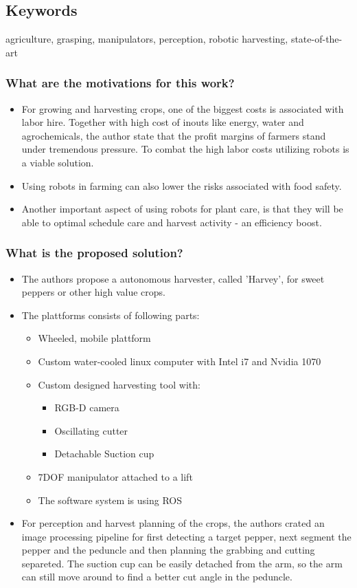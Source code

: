     \subsection*{Keywords}
    agriculture, grasping, manipulators, perception, robotic harvesting, state-of-the-art
    
    
     
    \subsubsection*{What are the motivations for this work?}
    \begin{itemize}
        \item For growing and harvesting crops, one of the biggest costs is associated with labor hire. Together with high cost of inouts like energy, water and agrochemicals, the author state that the profit margins of farmers stand under tremendous pressure. To combat the high labor costs utilizing robots is a viable solution.
        \item Using robots in farming can also lower the risks associated with food safety.
        \item Another important aspect of using robots for plant care, is that they will be able to optimal schedule care and harvest activity - an efficiency boost.
    \end{itemize}
    \subsubsection*{What is the proposed solution?}
    \begin{itemize}
        \item The authors propose a autonomous harvester, called 'Harvey', for sweet peppers or other high value crops.
        \item The plattforms consists of following parts: \ \begin{itemize}
            \item Wheeled, mobile plattform
            \item Custom water-cooled linux computer with Intel i7 and Nvidia 1070
            \item Custom designed harvesting tool with: \ \begin{itemize}
                \item RGB-D camera
                \item Oscillating cutter
                \item Detachable Suction cup
            \end{itemize}
            \item 7DOF manipulator attached to a lift
            \item The software system is using ROS 
        \end{itemize} 
        \item For perception and harvest planning of the crops, the authors crated an image processing pipeline for first detecting a target pepper, next segment the pepper and the peduncle and then planning the grabbing and cutting separeted. The suction cup can be easily detached from the arm, so the arm can still move around to find a better cut angle in the peduncle.
    \end{itemize}
